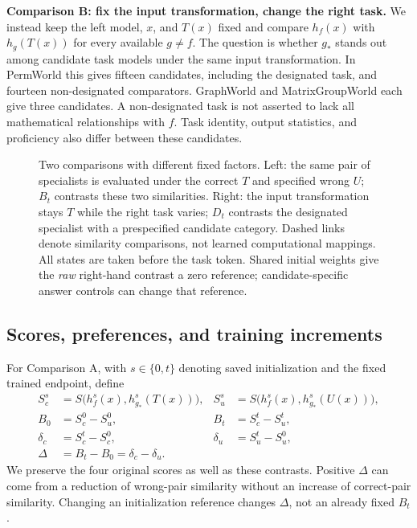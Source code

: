 \documentclass[10pt]{article}
\begin{document}
\textbf{Comparison B: fix the input transformation, change the right task.}
We instead keep the left model, $x$, and $T(x)$ fixed and compare
$h_f(x)$ with $h_g(T(x))$ for every available $g\ne f$.
The question is whether $g_*$ stands out among candidate task models under
the same input transformation. In PermWorld this gives fifteen candidates,
including the designated task, and fourteen non-designated comparators.
GraphWorld and MatrixGroupWorld each give three candidates. A
non-designated task is not asserted to lack all mathematical relationships
with $f$. Task identity, output statistics, and proficiency also differ
between these candidates.

\begin{figure}[t]
\centering

\caption{Two comparisons with different fixed factors. Left: the same pair
of specialists is evaluated under the correct $T$ and specified wrong $U$;
$B_t$ contrasts these two similarities. Right: the input transformation
stays $T$ while the right task varies; $D_t$ contrasts the designated
specialist with a prespecified candidate category. Dashed links denote
similarity comparisons, not learned computational mappings. All states are
taken before the task token. Shared initial weights give the \emph{raw}
right-hand contrast a zero reference; candidate-specific answer controls
can change that reference.}
\label{fig:comparisons}
\end{figure}

\subsection{Scores, preferences, and training increments}
For Comparison A, with $s\in\{0,t\}$ denoting saved initialization and the
fixed trained endpoint, define
\begin{align}
 S_c^s &= S\bigl(h_f^s(x),h_{g_*}^s(T(x))\bigr), &
 S_u^s &= S\bigl(h_f^s(x),h_{g_*}^s(U(x))\bigr),\nonumber\\
 B_0 &= S_c^0-S_u^0, & B_t&=S_c^t-S_u^t,\label{eq:preferences}\\
 \delta_c &= S_c^t-S_c^0, & \delta_u&=S_u^t-S_u^0,\nonumber\\
 \Delta &=B_t-B_0=\delta_c-\delta_u.\label{eq:increment}
\end{align}
We preserve the four original scores as well as these contrasts. Positive
$\Delta$ can come from a reduction of wrong-pair similarity without an
increase of correct-pair similarity. Changing an initialization reference
changes $\Delta$, not an already fixed $B_t$.
\end{document}
